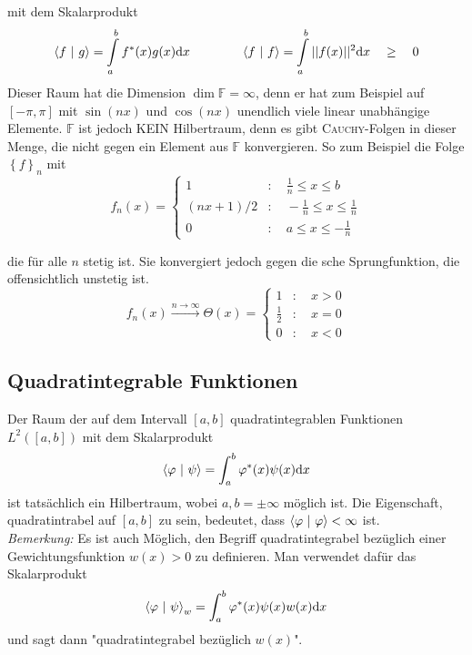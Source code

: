\documentclass[a4paper,12pt,portrait]{book}
\numberwithin{equation}{section}
\begin{document}
mit dem Skalarprodukt
\begin{equation*}
\left\langle f \ \middle| \ g\right\rangle=\int\limits_a^b f^*(x)g(x)\mathrm{d}x\qquad\qquad \left\langle f \ \middle| \ f\right\rangle=\int\limits_a^b ||f(x)||^2\mathrm{d}x \quad\geq\quad 0
\end{equation*}
Dieser Raum hat die Dimension $\dim\mathbb{F}=\infty$, denn er hat zum Beispiel auf $\left[-\pi,\pi\right]$ mit $\sin(nx)$ und $\cos(nx)$ unendlich viele linear unabhängige Elemente. $\mathbb{F}$ ist jedoch KEIN Hilbertraum, denn es gibt \textsc{Cauchy}-Folgen in dieser Menge, die nicht gegen ein Element aus $\mathbb{F}$ konvergieren. So zum Beispiel die Folge $\left\lbrace f\right\rbrace_n$ mit
\begin{equation*}
f_n(x)= 
\begin{cases}
1 & : \quad \frac{1}{n}\leq x \leq b \\
(nx+1)/2 &  : \quad  -\frac{1}{n} \leq x \leq \frac{1}{n} \\
0 & : \quad a\leq x \leq -\frac{1}{n}
\end{cases}
\end{equation*}

die für alle $n$ stetig ist. Sie konvergiert jedoch gegen die 
sche Sprungfunktion, die offensichtlich unstetig ist.
\begin{equation*}
f_n(x) \xrightarrow{n\rightarrow\infty} \Theta (x) = 
\begin{cases}
1 & :\quad x > 0 \\
\frac{1}{2} & :\quad x = 0 \\
0 & :\quad x < 0
\end{cases}
\end{equation*}

\subsection{Quadratintegrable Funktionen}
Der Raum der auf dem Intervall $[a,b]$ quadratintegrablen Funktionen $L^2([a,b])$ mit dem Skalarprodukt
\begin{equation*}
\left\langle \varphi \ \middle| \ \psi\right\rangle = \int_a^b \varphi^* (x)\psi(x)\mathrm{d}x
\end{equation*}
ist tatsächlich ein Hilbertraum, wobei $a,b=\pm\infty$ möglich ist. Die Eigenschaft, quadratintrabel auf $[a,b]$ zu sein, bedeutet, dass $\left\langle \varphi \ \middle| \ \varphi\right\rangle<\infty$ ist.\\

\emph{Bemerkung:} Es ist auch Möglich, den Begriff quadratintegrabel bezüglich einer Gewichtungsfunktion $w(x)>0$ zu definieren. Man verwendet dafür das Skalarprodukt
\begin{equation*}
\left\langle \varphi \ \middle| \ \psi\right\rangle_w = \int_a^b\varphi^*(x)\psi(x)w(x)\mathrm{d}x
\end{equation*}
und sagt dann "quadratintegrabel bezüglich $w(x)$". \\
\end{document}
